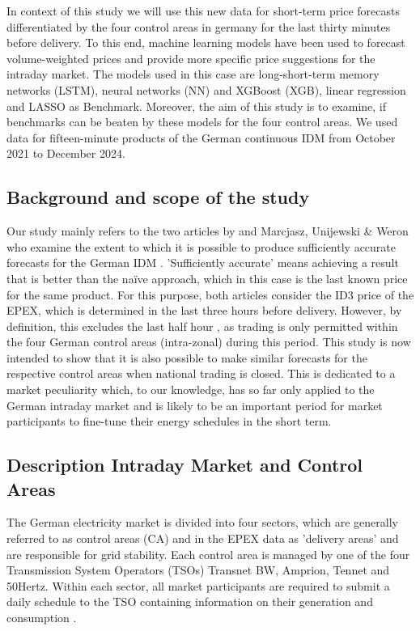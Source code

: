 \documentclass[preprint,12pt,nonatbib]{elsarticle}
\begin{document}
In context of this study we will use this new data for short-term price forecasts differentiated by the four control areas in germany for the last thirty minutes before delivery.
To this end, machine learning models have been used to forecast volume-weighted prices and provide more specific price suggestions for the intraday market.
The models used in this case are long-short-term memory networks (LSTM), neural networks (NN) and XGBoost (XGB), linear regression and LASSO as Benchmark.
Moreover, the aim of this study is to examine, if benchmarks can be beaten by these models for the four control areas. 
We used data for fifteen-minute products of the German continuous IDM from October 2021 to December 2024.

\subsection{Background and scope of the study}
Our study mainly refers to the two articles by and Marcjasz, Unijewski \& Weron who examine the extent to which it is possible to produce sufficiently accurate forecasts for the German IDM \cite{Marcjasz.2020, Narajewski.2020}.
'Sufficiently accurate' means achieving a result that is better than the naïve approach, which in this case is the last known price for the same product.
For this purpose, both articles consider the ID3 price of the EPEX, which is determined in the last three hours before delivery.
However, by definition, this excludes the last half hour \cite{Narajewski.2020}, as trading is only permitted within the four German control areas (intra-zonal) during this period.
This study is now intended to show that it is also possible to make similar forecasts for the respective control areas when national trading is closed.
This is dedicated to a market peculiarity which, to our knowledge, has so far only applied to the German intraday market and is likely to be an important period for market participants to fine-tune their energy schedules in the short term.

\subsection{Description Intraday Market and Control Areas}
The German electricity market is divided into four sectors, which are generally referred to as control areas (CA) and in the EPEX data as 'delivery areas' and are responsible for grid stability.
Each control area is managed by one of the four Transmission System Operators (TSOs) Transnet BW, Amprion, Tennet and 50Hertz.
Within each sector, all market participants are required to submit a daily schedule to the TSO containing information on their generation and consumption \cite{Linnemann.2024,TSOGermany.2022b}.
\end{document}
